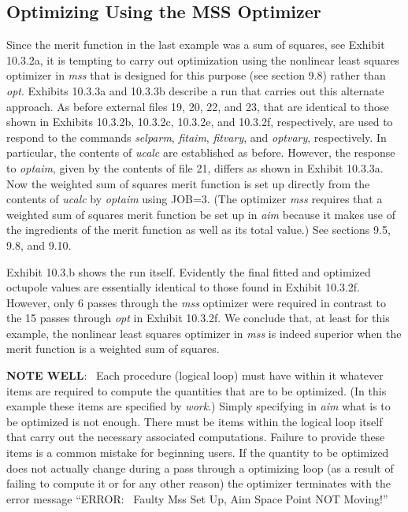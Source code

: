 \subsection{Optimizing Using the MSS Optimizer}  
\label{mss}
Since the merit function in the last example was a sum of squares, see
Exhibit 10.3.2a, it is tempting to carry out optimization using the
nonlinear least squares optimizer in {\em mss} that is designed for this
purpose (see section 9.8) rather than {\em opt}.  Exhibits 10.3.3a and
10.3.3b describe a
\Mary run that carries out this alternate approach.  As before external
files 19, 20, 22, and 23, that are identical to those shown in Exhibits
10.3.2b, 10.3.2c, 10.3.2e, and 10.3.2f, respectively, are used to respond
to the commands {\em selparm}, {\em fitaim}, {\em fitvary}, and {\em
optvary}, respectively.  In particular, the contents of {\em ucalc} are
established as before.  However, the response to {\em optaim}, given by
the contents of file 21, differs as shown in Exhibit 10.3.3a.  Now the
weighted sum of squares merit function is set up directly from the
contents of {\em ucalc} by {\em optaim} using JOB=3.  (The optimizer {\em
mss} requires that a weighted sum of squares merit function be set up in
{\em aim} because it makes use of the ingredients of the merit function
as well as its total value.)  See sections 9.5, 9.8, and 9.10.

Exhibit 10.3.b shows the \Mary run itself.  Evidently the final fitted
and optimized octupole values are essentially identical to those found in
Exhibit 10.3.2f.  However, only 6 passes through the {\em mss} optimizer
were required in contrast to the 15 passes through {\em opt} in Exhibit
10.3.2f.  We conclude that, at least for this example, the nonlinear
least squares optimizer in {\em mss} is indeed superior when the merit
function is a weighted sum of squares.

{\bf NOTE WELL}: \ Each procedure (logical loop) must have within it
whatever items are required to compute the quantities that are to be
optimized.  (In this example these items are specified by {\em work}.)  Simply specifying in {\em aim} what is to be optimized is not enough.
There must be items within the logical loop itself that carry out the
necessary associated computations.  Failure to provide these items is a
common mistake for beginning \Mary users.  If the quantity to be optimized
does
not actually change during a pass through a optimizing loop (as a result of
failing to compute it or for any other reason) the optimizer terminates with the
error message ``ERROR: \ Faulty Mss Set Up, Aim Space Point NOT Moving!''


